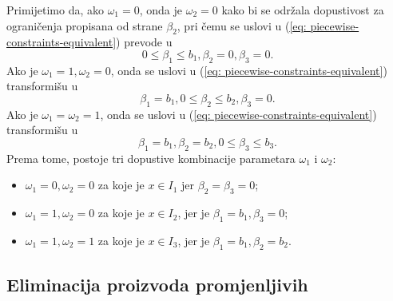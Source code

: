 \documentclass[a4paper, utf8, 11pt, colorlinks]{book}
\theoremstyle{definition}
\begin{document}
      Primijetimo da, ako $\omega_1 = 0$, onda je $\omega_2= 0$ kako bi se održala dopustivost za ograničenja propisana  od strane $\beta_2$, pri čemu se uslovi u (\ref{eq: piecewise-constraints-equivalent}) prevode u
      $$ 0 \leq \beta_1 \leq b_1, \beta_2 =0, \beta_3 =0.$$
      Ako je $\omega_1 = 1, \omega_2 = 0$, onda se uslovi u (\ref{eq: piecewise-constraints-equivalent}) transformišu u
            $$   \beta_1 = b_1, 0 \leq \beta_2 \leq b_2, \beta_3 =0.$$
    Ako je $\omega_1 = \omega_2 = 1$, onda se  uslovi u (\ref{eq: piecewise-constraints-equivalent}) transformišu u
    $$ \beta_1 = b_1, \beta_2 = b_2, 0 \leq \beta_3 \leq b_3.$$
    Prema tome, postoje tri dopustive kombinacije parametara $\omega_1$ i $\omega_2$:
    \begin{itemize}
             \item  $\omega_1 = 0, \omega_2= 0$ za koje je $x \in I_1$ jer $\beta_2=\beta_3=0$;  
             \item $\omega_1 = 1, \omega_2 = 0$ za koje je $x\in I_2$, jer je $\beta_1=b_1, \beta_3=0$;
              \item $\omega_1 = 1, \omega_2 = 1$ za koje je $x\in I_3$, jer je $\beta_1=b_1, \beta_2=b_2$.
    \end{itemize}
 
 
 \subsection{Eliminacija proizvoda promjenljivih}
 
\end{document}
